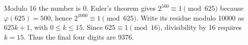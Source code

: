 Modulo 16 the number is 0. Euler's theorem gives $2^{500}\equiv1\pmod{625}$ because $\varphi(625)=500$, hence $2^{1000}\equiv1\pmod{625}$. Write its residue modulo 10000 as $625k+1$, with $0\le k\le15$. Since $625\equiv1\pmod{16}$, divisibility by 16 requires $k=15$. Thus the final four digits are $\boxed{9376}$.

